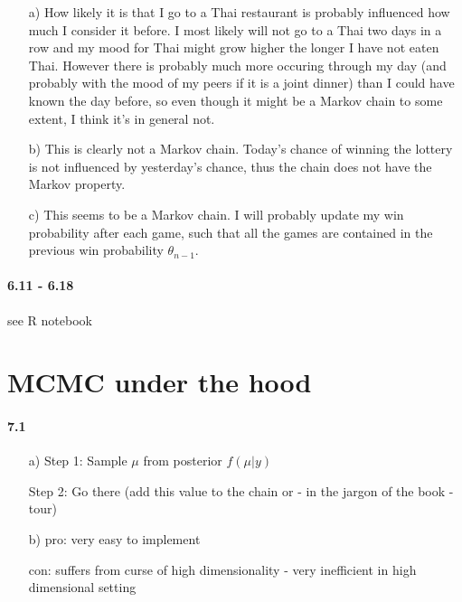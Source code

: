 \documentclass[fontsize=11pt,DIV=18,parskip=half]{scrartcl}
\begin{document}
\begin{enumerate}
\item[a)] How likely it is that I go to a Thai restaurant is probably influenced how much I consider it before. I most likely will not go to a Thai two days in a row and my mood for Thai might grow higher the longer I have not eaten Thai. However there is probably much more occuring through my day (and probably with the mood of my peers if it is a joint dinner) than I could have known the day before, so even though it might be a Markov chain to some extent, I think it's in general not.
\item[b)] This is clearly not a Markov chain. Today's chance of winning the lottery is not influenced by yesterday's chance, thus the chain does not have the Markov property.
\item[c)] This seems to be a Markov chain. I will probably update my win probability after each game, such that all the games are contained in the previous win probability $\theta_{n-1}$.
\end{enumerate}

\paragraph{6.11 - 6.18} see R notebook

\section{MCMC under the hood}

\paragraph{7.1}
\begin{enumerate}
\item[a)] 
Step 1: Sample $\mu$ from posterior $f(\mu|y)$

Step 2: Go there (add this value to the chain or - in the jargon of the book - tour)
\item[b)] pro: very easy to implement

con: suffers from curse of high dimensionality - very inefficient in high dimensional setting
\end{enumerate}
\end{document}
